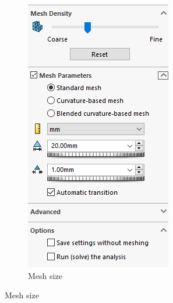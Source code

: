 \documentclass[12pt, letterpaper]{article}
\begin{document}
\begin{figure}[H]
\begin{subfigure}[t]{.3\linewidth}
		\includegraphics[width=\linewidth]{./procedure/mesh}
		\caption{Mesh size}
	\end{subfigure}
\end{figure}
\end{document}
